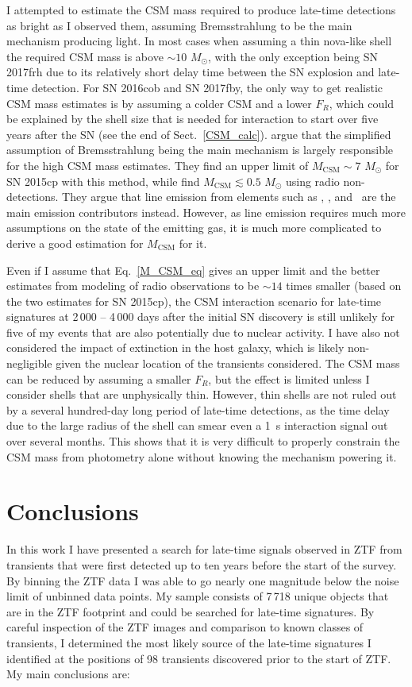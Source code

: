 \documentclass[a4paper,oneside,12pt, class=Latex/Classes/PhDthesisPSnPDF, crop=false]{standalone}
\begin{document}
I attempted to estimate the CSM mass required to produce late-time detections as bright as I observed them, assuming Bremsstrahlung to be the main mechanism producing light. In most cases when assuming a thin nova-like shell the required CSM mass is above $\sim 10$ $M_\odot$, with the only exception being SN 2017frh due to its relatively short delay time between the SN explosion and late-time detection. For SN 2016cob and SN 2017fby, the only way to get realistic CSM mass estimates is by assuming a colder CSM and a lower $F_R$, which could be explained by the shell size that is needed for interaction to start over five years after the SN (see the end of Sect.~\ref{CSM_calc}). \citet{2015cp} argue that the simplified assumption of Bremsstrahlung being the main mechanism is largely responsible for the high CSM mass estimates. They find an upper limit of $M_\text{CSM} \sim 7$ $M_\odot$ for SN 2015cp with this method, while \citet{2015cp_radio} find $M_\text{CSM} \lesssim 0.5$ $M_\odot$ using radio non-detections. They argue that line emission from elements such as , , and ~are the main emission contributors instead. However, as line emission requires much more assumptions on the state of the emitting gas, it is much more complicated to derive a good estimation for $M_\text{CSM}$ for it.

Even if I assume that Eq.~\ref{M_CSM_eq} gives an upper limit and the better estimates from modeling of radio observations to be $\sim14$ times smaller (based on the two estimates for SN 2015cp), the CSM interaction scenario for late-time signatures at 2\,000 -- 4\,000 days after the initial SN discovery is still unlikely for five of my events that are also potentially due to nuclear activity. I have also not considered the impact of extinction in the host galaxy, which is likely non-negligible given the nuclear location of the transients considered. The CSM mass can be reduced by assuming a smaller $F_R$, but the effect is limited unless I consider shells that are unphysically thin. However, thin shells are not ruled out by a several hundred-day long period of late-time detections, as the time delay due to the large radius of the shell can smear even a 1~s interaction signal out over several months. This shows that it is very difficult to properly constrain the CSM mass from photometry alone without knowing the mechanism powering it.

\section{Conclusions}
\label{Pre-ZTF_conclusions}
In this work I have presented a search for late-time signals observed in ZTF from transients that were first detected up to ten years before the start of the survey. By binning the ZTF data I was able to go nearly one magnitude below the noise limit of unbinned data points. My sample consists of 7\,718 unique objects that are in the ZTF footprint and could be searched for late-time signatures. By careful inspection of the ZTF images and comparison to known classes of transients, I determined the most likely source of the late-time signatures I identified at the positions of 98 transients discovered prior to the start of ZTF. My main conclusions are:
\end{document}
